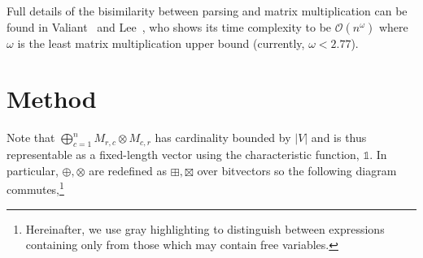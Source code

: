 \documentclass[sigplan,nonacm,anonymous]{acmart}\settopmatter{printfolios=false,printccs=false,printacmref=false}
\begin{document}
  \noindent Full details of the bisimilarity between parsing and matrix multiplication can be found in Valiant~\cite{valiant1975general} and Lee~\cite{lee2002fast}, who shows its time complexity to be $\mathcal{O}(n^\omega)$ where $\omega$ is the least matrix multiplication upper bound (currently, $\omega < 2.77$).

  \section{Method}

  Note that $\bigoplus_{c = 1}^n M_{r,c} \otimes M_{c,r}$ has cardinality bounded by $|V|$ and is thus representable as a fixed-length vector using the characteristic function, $\mathds{1}$. In particular, $\oplus, \otimes$ are redefined as $\boxplus, \boxtimes$ over bitvectors so the following diagram commutes,\footnote{Hereinafter, we use gray highlighting to distinguish between expressions containing only  from those which may contain free variables.}
\end{document}
